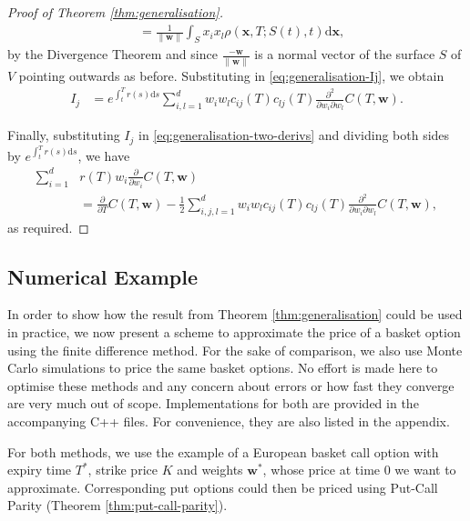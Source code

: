 \documentclass[english]{article}
\numberwithin{equation}{section}
\numberwithin{figure}{section}
\theoremstyle{bolddescit}
\theoremstyle{definition}
\theoremstyle{definition}
\theoremstyle{plain}
\theoremstyle{plain}
\theoremstyle{bolddesc}
\theoremstyle{plain}
\theoremstyle{remark}
\begin{document}
\begin{proof}[Proof of Theorem \ref{thm:generalisation}]
\begin{align*}
    &= \frac{1}{\|\mathbf{w}\|} \int_S x_i x_l \rho(\mathbf{x},T;S(t),t) \mathrm{d}\mathbf{x},
  \end{align*}
  by the Divergence Theorem and since $\frac{-\mathbf{w}}{\|\mathbf{w}\|}$ is a normal vector of the surface $S$ of $V$ pointing outwards as before. Substituting in \eqref{eq:generalisation-Ij}, we obtain
  \begin{align*}
    I_j
    &= e^{\int_t^T r(s) \mathrm{d}s} \sum_{i,l=1}^{d} w_i w_l c_{ij}(T) c_{lj}(T) \frac{\partial^2}{\partial w_i \partial w_l} C(T,\mathbf{w}).
  \end{align*}

  Finally, substituting $I_j$ in \eqref{eq:generalisation-two-derivs} and dividing both sides by $e^{\int_t^T r(s) \mathrm{d}s}$, we have
  \begin{align*}
    \sum_{i=1}^{d} &r(T) w_i \frac{\partial}{\partial w_i} C(T,\mathbf{w})\\
    &= \frac{\partial}{\partial T} C(T,\mathbf{w}) - \frac{1}{2} \sum_{i,j,l=1}^{d} w_i w_l c_{ij}(T) c_{lj}(T) \frac{\partial^2}{\partial w_i \partial w_l} C(T,\mathbf{w}),
  \end{align*}
  as required.
\end{proof}

\subsection{Numerical Example}


In order to show how the result from Theorem \ref{thm:generalisation} could be used in practice, we now present a scheme to approximate the price of a basket option using the finite difference method. For the sake of comparison, we also use Monte Carlo simulations to price the same basket options. No effort is made here to optimise these methods and any concern about errors or how fast they converge are very much out of scope. Implementations for both are provided in the accompanying C++ files. For convenience, they are also listed in the appendix.

For both methods, we use the example of a European basket call option with expiry time $T^*$, strike price $K$ and weights $\mathbf{w}^*$, whose price at time 0 we want to approximate. Corresponding put options could then be priced using Put-Call Parity (Theorem \ref{thm:put-call-parity}).
\end{document}
